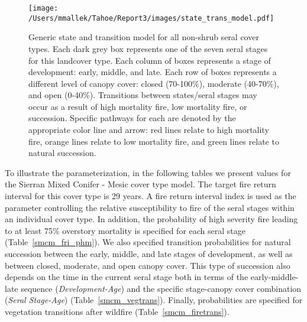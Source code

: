 \begin{figure}[htbp]
\centering
\texttt{[image: /Users/mmallek/Tahoe/Report3/images/state\_trans\_model.pdf]}
\caption{Generic state and transition model for all non-shrub seral cover types. Each dark grey box represents one of the seven seral stages for this landcover type. Each column of boxes represents a stage of development: early, middle, and late. Each row of boxes represents a different level of canopy cover: closed (70-100\%), moderate (40-70\%), and open (0-40\%). Transitions between states/seral stages may occur as a result of high mortality fire, low mortality fire, or succession. Specific pathways for each are denoted by the appropriate color line and arrow: red lines relate to high mortality fire, orange lines relate to low mortality fire, and green lines relate to natural succession.} 
\label{transmodel}
\end{figure}

To illustrate the parameterization, in the following tables we present values for the Sierran Mixed Conifer - Mesic cover type model. The target fire return interval for this cover type is 29 years. A fire return interval index is used as the parameter controlling the relative susceptibility to fire of the seral stages within an individual cover type. In addition, the probability of high severity fire leading to at least 75\% overstory mortality is specified for each seral stage (Table~\ref{smcm_fri_phm}). We also specified transition probabilities for natural succession between the early, middle, and late stages of development, as well as between closed, moderate, and open canopy cover. This type of succession also depends on the time in the current seral stage both in terms of the early-middle-late sequence (\emph{Development-Age}) and the specific stage-canopy cover combination (\emph{Seral Stage-Age}) (Table~\ref{smcm_vegtrans}). Finally, probabilities are specified for vegetation transitions after wildfire (Table~\ref{smcm_firetrans}).




